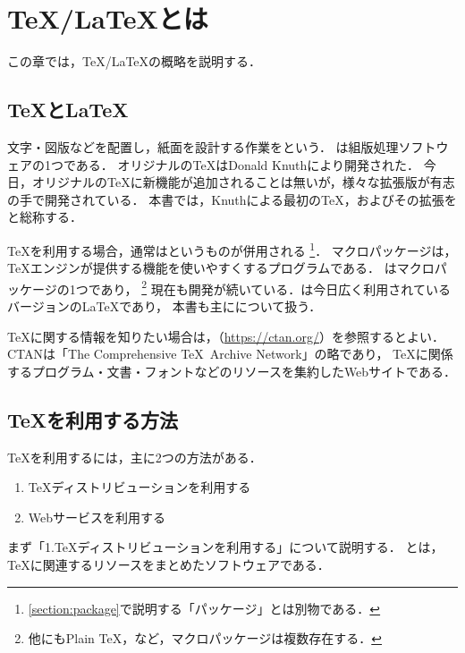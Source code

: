 \documentclass[../../index]{subfiles}
\begin{document}
\chapter{\TeX /\LaTeX とは}
この章では，\TeX /\LaTeX の概略を説明する．

\section{\TeX と\LaTeX}
文字・図版などを配置し，紙面を設計する作業をという．
\termdef{\TeX}は組版処理ソフトウェアの1つである．
オリジナルの\TeX はDonald Knuthにより開発された．
今日，オリジナルの\TeX に新機能が追加されることは無いが，様々な拡張版が有志の手で開発されている．
本書では，Knuthによる最初の\TeX ，およびその拡張を
と総称する．

\TeX を利用する場合，通常はというものが併用される
\footnote{\cref{section:package}で説明する「パッケージ」とは別物である．}．
マクロパッケージは，\TeX エンジンが提供する機能を使いやすくするプログラムである．
\termdef{\LaTeX}はマクロパッケージの1つであり，
\footnote{他にもPlain \TeX，\ConTeXt など，マクロパッケージは複数存在する．}
現在も開発が続いている．\termdef{\LaTeXe}は今日広く利用されているバージョンの\LaTeX であり，
本書も主に\LaTeXe について扱う．

\TeX に関する情報を知りたい場合は，（\url{https://ctan.org/}）を参照するとよい．
CTANは「The Comprehensive \TeX\ Archive Network」の略であり，
\TeX に関係するプログラム・文書・フォントなどのリソースを集約したWebサイトである．

\section{\TeX を利用する方法}
\TeX を利用するには，主に2つの方法がある．

\begin{enumerate}
  \item \TeX ディストリビューションを利用する
  \item Webサービスを利用する
\end{enumerate}

まず「1.\TeX ディストリビューションを利用する」について説明する．
とは，
\TeX に関連するリソースをまとめたソフトウェアである．
\end{document}
